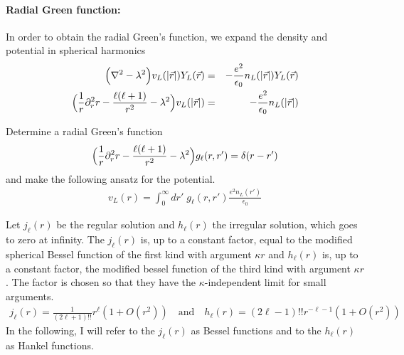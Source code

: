 \documentclass[11pt,a4paper]{report}
\begin{document}
\paragraph{Radial Green function:}
In order to obtain the radial Green's function, we expand the density
and potential in spherical harmonics
\begin{eqnarray}
\Bigl(\nabla^2 -\lambda^2\Bigr)v_L(|\vec{r}|)Y_L(\vec{r})
&=&-\frac{e^2}{\epsilon_0}n_L(|\vec{r}|)Y_L(\vec{r})
\nonumber\\
\Bigl(\frac{1}{r}\partial^2_r r-\frac{\ell(\ell+1)}{r^2}-\lambda^2\Bigr)
v_L(|\vec{r}|)&=&-\frac{e^2}{\epsilon_0}n_L(|\vec{r}|)
\nonumber\\
\end{eqnarray}

Determine a radial Green's function
\begin{eqnarray}
\Bigl(\frac{1}{r}\partial_r^2 r-\frac{\ell(\ell+1)}{r^2}-\lambda^2\Bigr)
g_{\ell}(r,r')=\delta(r-r')
\end{eqnarray}
and make the following ansatz for the potential.
\begin{eqnarray}
v_L(r)=\int_0^\infty dr'\; g_\ell(r,r')\frac{e^2n_L(r')}{\epsilon_0}
\end{eqnarray}

Let $j_\ell(r)$ be the regular solution and $h_\ell(r)$ the irregular
solution, which goes to zero at infinity. The $j_\ell(r)$ is, up to a
constant factor, equal to the modified spherical Bessel function of
the first kind with argument $\kappa r$ and $h_\ell(r)$ is, up to a
constant factor, the modified bessel function of the third kind with
argument $\kappa r$.  The factor is chosen so that they have the
$\kappa$-independent limit for small arguments.
\begin{eqnarray}
j_\ell(r)=\frac{1}{(2\ell+1)!!}r^\ell(1+O(r^2))
\quad\text{and}\quad
h_\ell(r)=(2\ell-1)!!r^{-\ell-1}(1+O(r^2))
\end{eqnarray}
In the following, I will refer to the $j_\ell(r)$ as Bessel functions
and to the $h_\ell(r)$ as Hankel functions.
\end{document}
